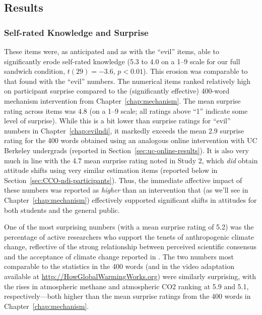 % 

\subsection{Results}

\subsubsection{Self-rated Knowledge and Surprise}

These items were, as anticipated and as with the “evil” items, able to
significantly erode self-rated knowledge (5.3 to 4.0 on a 1--9 scale for our full sandwich
condition, $t(29)=-3.6$, $p<0.01$).  This erosion was comparable to that found
with the “evil” numbers.  The numerical items ranked relatively high on
participant surprise compared to the (significantly effective) 400-word
mechanism intervention from Chapter~\ref{chap:mechanism}.  The mean surprise
rating across items was 4.8 (on a 1--9 scale; all ratings above “1” indicate
some level of surprise).  While this is a bit lower than surprise ratings for
“evil” numbers in Chapter~\ref{chap:evilndi}, it markedly exceeds the mean 2.9
surprise rating for the 400 words obtained using an analogous online
intervention with UC Berkeley undergrads (reported in
Section~\ref{sec:uc-online-results}). It is also very much in line with the 4.7
mean surprise rating noted in Study 2, which \emph{did} obtain attitude shifts
using very similar estimation items (reported below in
Section~\ref{sec:CCO-ndi-participants}). Thus, the immediate affective impact of
these numbers was reported as \emph{higher} than an intervention that (as we'll
see in Chapter~\ref{chap:mechanism}) effectively supported significant shifts in
attitudes for both students and the general public.

One of the most surprising numbers (with a mean surprise rating of 5.2) was the percentage of active
researchers who support the tenets of anthropogenic climate change, reflective
of the strong relationship between perceived scientific consensus and the acceptance
of climate change reported in \textcite{lewandowsky_pivotal_2013}. The two
numbers most comparable to the statistics in the 400 words (and in the video
adaptation available at \url{http://HowGlobalWarmingWorks.org}) were similarly
surprising, with the rises in atmospheric methane and atmospheric CO2 ranking at
5.9 and 5.1, respectively---both higher than the mean surprise ratings from the
400 words in Chapter~\ref{chap:mechanism}.


